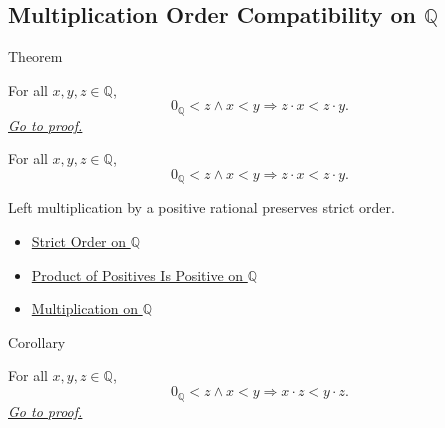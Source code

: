 \subsection*{\texorpdfstring{Multiplication Order Compatibility on $\mathbb{Q}$}{Multiplication Order Compatibility on Q}}

\begin{theorembox}{Theorem}
\begin{theorem}
\label{thm:left-positive-multiplication-preserves-strict-order-on-q}
For all $x,y,z\in\mathbb{Q}$,
\[
0_{\mathbb{Q}}<z\land x<y
\Longrightarrow
z\cdot x<z\cdot y.
\]
\hyperref[prf:left-positive-multiplication-preserves-strict-order-on-q]{\textit{Go to proof.}}
\end{theorem}
\end{theorembox}

\begin{remark*}
For all $x,y,z\in\mathbb{Q}$,
\[
0_{\mathbb{Q}}<z\land x<y
\Longrightarrow
z\cdot x<z\cdot y.
\]
\end{remark*}

\begin{remark*}[Interpretation]
Left multiplication by a positive rational preserves strict order.
\end{remark*}

\begin{dependencies}
\begin{itemize}
  \item \hyperref[def:strict-order-on-q]{Strict Order on $\mathbb{Q}$}
  \item \hyperref[prop:product-of-positives-is-positive-q]{Product of Positives Is Positive on $\mathbb{Q}$}
  \item \hyperref[def:multiplication-on-q-classes]{Multiplication on $\mathbb{Q}$}
\end{itemize}
\end{dependencies}

\begin{corollarybox}{Corollary}
\begin{corollary}
\label{cor:right-positive-multiplication-preserves-strict-order-on-q}
For all $x,y,z\in\mathbb{Q}$,
\[
0_{\mathbb{Q}}<z\land x<y
\Longrightarrow
x\cdot z<y\cdot z.
\]
\hyperref[prf:right-positive-multiplication-preserves-strict-order-on-q]{\textit{Go to proof.}}
\end{corollary}
\end{corollarybox}

